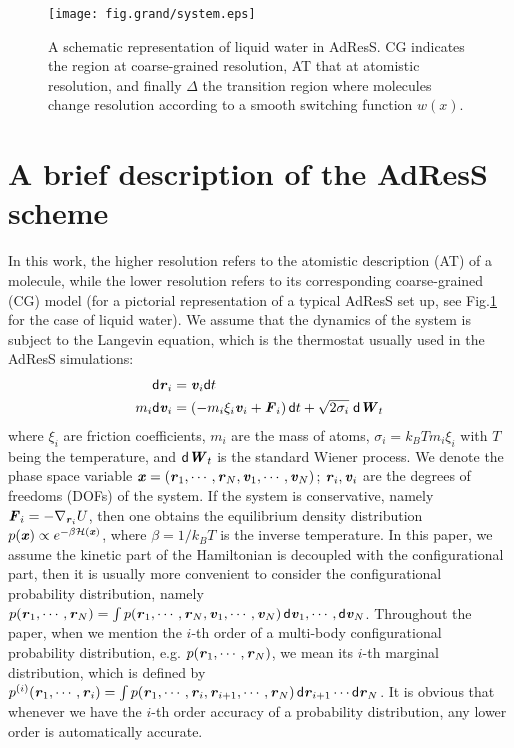 \documentclass[aip,jcp,a4paper,reprint,onecolumn]{revtex4-1}
\newcommand{\redc}[1]{{\color{red} #1}}
\newcommand{\vect}[1]{\textbf{\textit{#1}}}
\newcommand{\dd}[1]{\textsf{#1}}
\begin{document}
\begin{figure}
  \centering
  \texttt{[image: fig.grand/system.eps]}
  \caption{A schematic representation of liquid water in AdResS. CG indicates the region at coarse-grained resolution, AT that at atomistic resolution, and finally $\Delta$ the transition region where molecules change resolution according to a smooth switching function $w(x)$.}
  \label{fig:adress-water}
\end{figure}

\section{A brief description of the AdResS scheme}

In this work, the higher resolution refers to the atomistic
description (AT) of a molecule, while the lower resolution refers to
its corresponding coarse-grained (CG) model (for a pictorial representation of a typical AdResS set up, see Fig.\ref{fig:adress-water} for the case of liquid water).  We assume that the dynamics of the
system is subject to the Langevin equation, which is the thermostat
usually used in the AdResS simulations:
\begin{align}
  \dd d\vect r_i &= \vect v_i\dd dt\\
  m_i\dd d\vect v_i &= (-m_i\xi_i\vect v_i + \vect F_i)\,\dd dt + \sqrt{2\sigma_i}\;\dd d\vect W_t
\end{align}
where $\xi_i$ are friction coefficients,
$m_i$ are the mass of atoms, $\sigma_i = k_BTm_i\xi_i$ with $T$ being
the temperature, and
$\dd d\vect W_t$ is the standard Wiener process. We denote the
phase space variable \redc{$\vect x = (\vect r_1,\cdots,\vect r_N, \vect v_1,\cdots,\vect v_N)$;} $\vect r_i,
\vect v_i$ are the degrees of freedoms (DOFs) of the system.  If the
system is conservative, namely $\vect F_i = -\nabla_{\vect r_i}U$,
then one obtains the equilibrium density distribution $p(\vect
x)\propto e^{-\beta\mathcal H(\vect x)}$, where $\beta = 1/k_BT$ is the inverse temperature.
\redc{
  In this paper, we assume
  the kinetic part of the Hamiltonian is decoupled with the configurational part, then
  it is usually more convenient to consider the configurational
  probability distribution, namely $ p(\vect r_1,\cdots,\vect r_N) =
  \int p(\vect r_1,\cdots,\vect r_N, \vect v_1,\cdots,\vect v_N)\,\dd d\vect v_1,\cdots,\dd d\vect v_N$.
Throughout the paper, when we mention the $i$-th order of a
  multi-body configurational probability distribution, e.g.
  $p(\vect r_1, \cdots, \vect r_N)$, we mean its $i$-th marginal
  distribution, which is defined by
  $p^{(i)}(\vect r_1, \cdots, \vect r_i)
  = \int p(\vect r_1, \cdots, \vect r_i, \vect r_{i+1}, \cdots, \vect r_N)\,
  \dd d \vect r_{i+1}\cdots\dd d \vect r_N$.
  It is obvious that
  whenever we have the $i$-th order accuracy of a probability distribution,
  any lower  order is automatically accurate.
}
\end{document}
